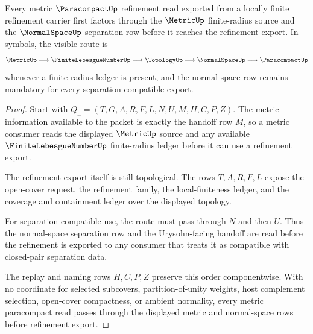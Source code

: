 \begin{theorem}
\label{thm:paracompact-metric-normal-route}
Every metric $\ParacompactUp$ refinement read exported from a locally finite refinement carrier first factors through the $\MetricUp$ finite-radius source and the $\NormalSpaceUp$ separation row before it reaches the refinement export. In symbols, the visible route is
$$
\MetricUp \longrightarrow \FiniteLebesgueNumberUp \longrightarrow \TopologyUp \longrightarrow \NormalSpaceUp \longrightarrow \ParacompactUp
$$
whenever a finite-radius ledger is present, and the normal-space row remains mandatory for every separation-compatible export.
\end{theorem}
\begin{proof}
Start with $Q_{\mathrm{lf}}=(T,G,A,R,F,L,N,U,M,H,C,P,Z)$. The metric information available to the packet is exactly the handoff row $M$, so a metric consumer reads the displayed $\MetricUp$ source and any available $\FiniteLebesgueNumberUp$ finite-radius ledger before it can use a refinement export.

The refinement export itself is still topological. The rows $T,A,R,F,L$ expose the open-cover request, the refinement family, the local-finiteness ledger, and the coverage and containment ledger over the displayed topology.

For separation-compatible use, the route must pass through $N$ and then $U$. Thus the normal-space separation row and the Urysohn-facing handoff are read before the refinement is exported to any consumer that treats it as compatible with closed-pair separation data.

The replay and naming rows $H,C,P,Z$ preserve this order componentwise. With no coordinate for selected subcovers, partition-of-unity weights, host complement selection, open-cover compactness, or ambient normality, every metric paracompact read passes through the displayed metric and normal-space rows before refinement export.
\end{proof}

